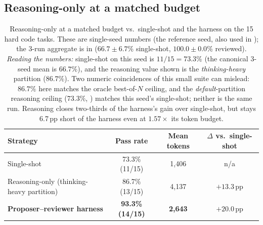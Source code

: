 \subsection{Reasoning-only at a matched budget}
\begin{table}[H]
\centering
\caption{Reasoning-only at a matched budget vs.\ single-shot and the harness on the 15 hard code tasks. These are single-seed numbers (the reference seed, also used in ); the 3-run aggregate is in  ($66.7 \pm 6.7$\% single-shot, $100.0 \pm 0.0$\% reviewed). \emph{Reading the numbers:} single-shot on this seed is $11/15 = 73.3\%$ (the canonical 3-seed mean is $66.7\%$), and the reasoning value shown is the \emph{thinking-heavy} partition ($86.7\%$). Two numeric coincidences of this small suite can mislead: $86.7\%$ here matches the oracle best-of-$N$ ceiling, and the \emph{default}-partition reasoning ceiling ($73.3\%$, ) matches this seed's single-shot; neither is the same run. Reasoning closes two-thirds of the harness's gain over single-shot, but stays 6.7\,pp short of the harness even at $1.57\times$ its token budget.}
\label{tab:reasoning-baseline}
\small
\begin{tabular}{lccc}
\toprule
Strategy & Pass rate & Mean tokens & $\Delta$ vs.\ single-shot \\
\midrule
Single-shot                       & 73.3\% (11/15) & 1{,}406  & n/a \\
Reasoning-only (thinking-heavy partition)   & 86.7\% (13/15) & 4{,}137  & $+13.3$\,pp \\
\textbf{Proposer--reviewer harness} & \textbf{93.3\% (14/15)} & \textbf{2{,}643}  & $\mathbf{+20.0}$\,pp \\
\bottomrule
\end{tabular}
\end{table}

